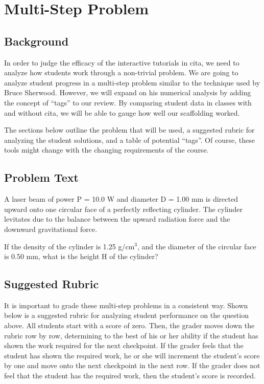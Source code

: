 \chapter[Multi-Step Problem]{Multi-Step Problem}

\section{Background}

In order to judge the efficacy of the interactive tutorials in \gls{cita}, we need to analyze how students work through a non-trivial problem. We are going to analyze student progress in a multi-step problem similar to the technique used by Bruce Sherwood\cite{sherwood2005}. However, we will expand on his numerical analysis by adding the concept of ``tags'' to our review. By comparing student data in classes with and without \gls{cita}, we will be able to gauge how well our scaffolding worked.

The sections below outline the problem that will be used, a suggested rubric for analyzing the student solutions, and a table of potential ``tags''. Of course, these tools might change with the changing requirements of the course.

\section{Problem Text}

A laser beam of power P = 10.0 W and diameter D = 1.00 mm is directed upward onto one circular face of a perfectly reflecting cylinder. The cylinder levitates due to the balance between the upward radiation force and the downward gravitational force.

If the density of the cylinder is 1.25 g/cm$^3$, and the diameter of the circular face is 0.50 mm, what is the height H of the cylinder?

\section{Suggested Rubric}

It is important to grade these multi-step problems in a consistent way. Shown below is a suggested rubric for analyzing student performance on the question above. All students start with a score of zero. Then, the grader moves down the rubric row by row, determining to the best of his or her ability if the student has shown the work required for the next checkpoint. If the grader feels that the student has shown the required work, he or she will increment the student's score by one and move onto the next checkpoint in the next row. If the grader does not feel that the student has the required work, then the student's score is recorded.


